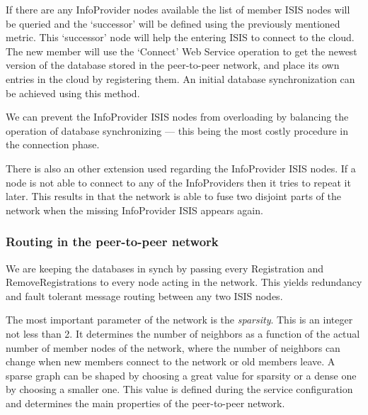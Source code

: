 \documentclass{book}
\begin{document}
If there are any InfoProvider nodes available the list of member ISIS nodes will be queried and the `successor' will be defined using the previously mentioned metric. This `successor' node will help the entering ISIS to connect to the cloud. The new member will use the `Connect' Web Service operation to get the newest version of the database stored in the peer-to-peer network, and place its own entries in the cloud by registering them. An initial database synchronization can be achieved using this method.

We can prevent the InfoProvider ISIS nodes from overloading by balancing the operation of database synchronizing --- this being the most costly procedure in the connection phase.

There is also an other extension used regarding the InfoProvider ISIS nodes. If a node is not able to connect to any of the InfoProviders then it tries to repeat it later. This results in that the network is able to fuse two disjoint parts of the network when the missing InfoProvider ISIS appears again.

\subsubsection{Routing in the peer-to-peer network}
We are keeping the databases in synch by passing every Registration and RemoveRegistrations to every node acting in the network. This yields redundancy and fault tolerant message routing between any two ISIS nodes.

The most important parameter of the network is the {\it sparsity}. This is an integer not less than 2. It determines the number of neighbors as a function of the actual number of member nodes of the network, where the number of neighbors can change when new members connect to the network or old members leave. A sparse graph can be shaped by choosing a great value for sparsity or a dense one by choosing a smaller one. This value is defined during the service configuration and determines the main properties of the peer-to-peer network.
\begin{figure}[ht]
\end{figure}
\end{document}
